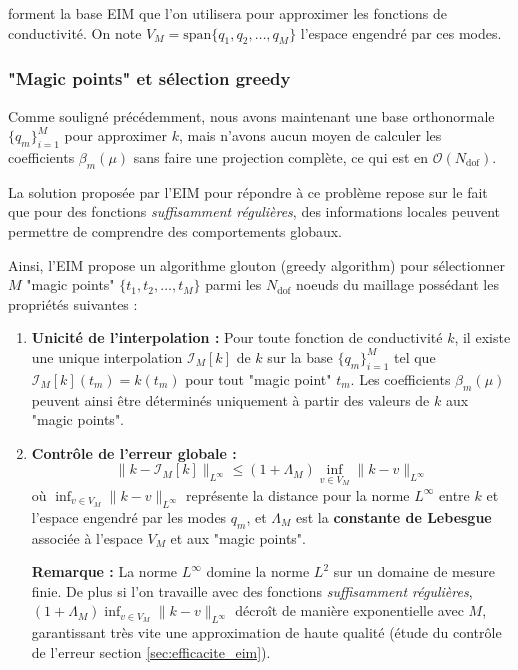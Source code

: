 \documentclass[12pt,a4paper]{article}
\begin{document}
forment la base EIM que l'on utilisera pour approximer les fonctions de conductivité. On note $V_M = \text{span}\{q_1, q_2, \ldots, q_M\}$ l'espace engendré par ces modes.


\subsubsection{"Magic points" et sélection greedy}

Comme souligné précédemment, nous avons maintenant une base orthonormale $\{q_m\}_{i=1}^{M}$ pour approximer $k$, mais n'avons aucun moyen de calculer les coefficients $\beta_m(\mu)$ sans faire une projection complète, ce qui est en $\mathcal{O}(N_{\text{dof}})$.


La solution proposée par l'EIM pour répondre à ce problème repose sur le fait que pour des fonctions \textit{suffisamment régulières}, des informations locales peuvent permettre de comprendre des comportements globaux.

Ainsi, l'EIM propose un algorithme glouton (greedy algorithm) pour sélectionner $M$ "magic points" $\{t_1, t_2, \ldots, t_M\}$ parmi les $N_{\text{dof}}$ noeuds du maillage possédant les propriétés suivantes :
\begin{enumerate}
\item \textbf{Unicité de l'interpolation \cite{barrault2004} :} Pour toute fonction de conductivité $k$, il existe une unique interpolation $\mathcal{I}_M[k]$ de $k$ sur la base $\{q_m\}_{i=1}^{M}$ tel que $\mathcal{I}_M[k](t_m) = k(t_m)$ pour tout "magic point" $t_m$. Les coefficients $\beta_m(\mu)$ peuvent ainsi être déterminés uniquement à partir des valeurs de $k$ aux "magic points".
\item \textbf{Contrôle de l'erreur globale \cite{barrault2004} :}
\begin{equation}
    \label{contrle_erreur_eim}
\| k - \mathcal{I}_M[k] \|_{L^\infty} \leq (1 + \Lambda_M) \inf_{v \in V_M} \| k - v \|_{L^\infty}
\end{equation}
où $\inf_{v \in V_M} \| k - v \|_{L^\infty}$ représente la distance pour la norme $L^\infty$ entre $k$ et l'espace engendré par les modes $q_m$, et $\Lambda_M$ est la \textbf{constante de Lebesgue} associée à l'espace $V_M$ et aux "magic points".

\textbf{Remarque :} La norme $L^\infty$ domine la norme $L^2$ sur un domaine de mesure finie. De plus si l'on travaille avec des fonctions \textit{suffisamment régulières}, $(1 + \Lambda_M) \inf_{v \in V_M} \| k - v \|_{L^\infty}$ décroît de manière exponentielle avec $M$, garantissant très vite une approximation de haute qualité (étude du contrôle de l'erreur section \ref{sec:efficacite_eim}).
\end{enumerate}
\end{document}
